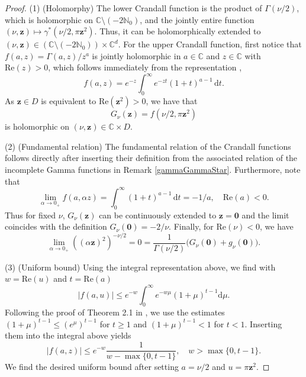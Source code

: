 \documentclass[]{amsart}
\newcommand{\new}[1]{#1}
\renewcommand{\d}{\,\mathrm{d}}
\numberwithin{mythm}{section}
\begin{document}
\begin{proof}
    (1) (Holomorphy) The lower Crandall function is the product of $\Gamma(\nu/2)$, which is holomorphic on $\mathds C\setminus (-2\mathds N_0)$, and the jointly entire function $(\nu,\bm z)\mapsto\gamma^*(\nu/2,\pi \bm z^2)$. Thus, \new{it can be holomorphically extended to} $(\nu,\bm z)\in (\mathds C\setminus (-2\mathds N_0))\times \mathds C^d$. For the upper Crandall function, first notice that $f(a,z)=\Gamma(a,z)/z^a$ is jointly holomorphic in $a\in \mathds C$ and $z\in \mathds C$ with $\mathrm{Re}(z)>0$, which follows immediately from the representation \cite[Eq.~(2.1)]{borwein2009uniform},
    \[
    f(a,z)=e^{-z}\int_{0}^\infty e^{-z t}(1+t)^{a-1}\,\mathrm d t.
    \]
    As $\bm z\in D$ is equivalent to $\mathrm{Re}(\bm z^2)>0$, we have that 
    \[
    G_\nu(\bm z) = f(\nu/2, \pi \bm z^2) 
    \]
    is holomorphic on $(\nu,\bm z) \in \mathds C\times D$. 

    (2) (Fundamental relation) The fundamental relation of the Crandall functions follows directly after inserting their definition from the associated relation of the incomplete Gamma functions in Remark \ref{gammaGammaStar}. Furthermore, note that
    \[
    \lim_{\alpha\to 0_+}f(a,\alpha z) = \int_{0}^\infty (1+t)^{a-1}\d t=-1/a,\quad \mathrm{Re}(a)<0.
    \]
    Thus for fixed $\nu$, $G_\nu(\bm z)$ can be continuously extended to $\bm z= \bm 0$ and the limit coincides with the definition $G_\nu(\bm 0)=-2/\nu$. Finally, for $\mathrm{Re}(\nu)<0$, we have
    \[
    \lim_{\alpha \to 0_+} ((\alpha\bm z)^2)^{-\nu/2} = 0 = \frac{1}{\Gamma(\nu/2)} \Big(G_\nu(\bm 0)+g_\nu(\bm 0)\Big).
    \]
    
    (3) (Uniform bound) 
    Using the integral representation above, we find with $w = \mathrm{Re}(u)$ and $t = \mathrm{Re}(a)$
    \[
    \vert f(a,u)\vert \le  e^{-w} \int_0^\infty  e^{-w\mu}(1+\mu)^{t-1}\mathrm d \mu.
    \]
    Following the proof of Theorem 2.1 in \cite{borwein2009uniform}, we use the estimates $(1+\mu)^{t-1}\le(e^\mu)^{t-1}$ for $t\ge 1$ and $(1+\mu)^{t-1}< 1$  for $t<1$. Inserting them into the integral above yields
    \[
    \vert f(a,z)\vert\le  e^{-w} \frac{1}{w-\max\{0,t-1\}},\quad w>\max\{0,t-1\}.
    \]
    We find the desired uniform bound after setting $a=\nu/2$ and $u=\pi \bm z^2$.
\end{proof}
\end{document}
